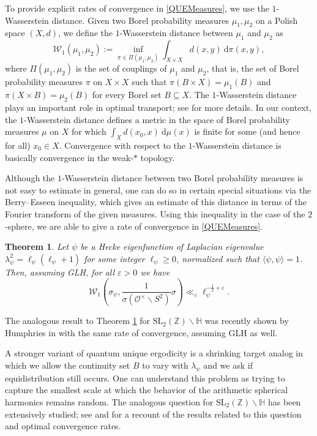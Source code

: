 \documentclass[11pt]{amsart}
\newtheorem{theorem}{Theorem}[section]
\theoremstyle{definition}
\begin{document}
To provide explicit rates of convergence in \eqref{QUEMeasures}, we use the $1$-Wasserstein distance. Given two Borel probability measures $\mu_1, \mu_2$ on a Polish space $(X,d)$, we define the $1$-Wasserstein distance between $\mu_1$ and $\mu_2$ as $$ \mathscr{W}_1(\mu_1, \mu_2) := \inf_{\pi \in \Pi(\mu_1,\mu_2)} \int_{X\times X} d(x,y) \: \mathrm{d}\pi(x,y), $$ where $\Pi(\mu_1, \mu_2)$ is the set of couplings of $\mu_1$ and $\mu_2$, that is, the set of Borel probability measures $\pi$ on $X\times X$ such that $\pi(B\times X)=\mu_1(B)$ and $\pi(X\times B) = \mu_2(B)$ for every Borel set $B\subseteq X$. The $1$-Wasserstein distance plays an important role in optimal transport; see \cite{VillaniOptTransport} for more details. In our context, the $1$-Wasserstein distance defines a metric in the space of Borel probability measures $\mu$ on $X$ for which $\int_{X} d(x_0, x) \: \mathrm{d}\mu(x)$ is finite for some (and hence for all) $x_0 \in X$. Convergence with respect to the $1$-Wasserstein distance is basically convergence in the weak-$*$ topology.

Although the $1$-Wasserstein distance between two Borel probability measures is not easy to estimate in general, one can do so in certain special situations via the Berry--Esseen inequality, which gives an estimate of this distance in terms of the Fourier transform of the given measures. Using this inequality in the case of the $2$-sphere, we are able to give a rate of convergence in \eqref{QUEMeasures}.

\begin{theorem}\label{MainThm-Wass}
Let $\psi$ be a Hecke eigenfunction of Laplacian eigenvalue $\lambda_{\psi}^2 = \ell_{\psi}(\ell_{\psi}+1)$ for some integer $\ell_{\psi} \geq 0$, normalized such that $\langle \psi, \psi \rangle = 1$. Then, assuming GLH, for all $\varepsilon>0$ we have $$ \mathscr{W}_{1}\left(\sigma_{\psi}, \frac{1}{\sigma(\mathcal{O}^{\times} \backslash S^2)} \sigma \right) \ll_{\varepsilon} \ell_{\psi}^{-\frac{1}{2} + \varepsilon}.$$
\end{theorem}

The analogous result to Theorem \ref{MainThm-Wass} for $\mathrm{SL}_{2}(\mathbb{Z}) \backslash \mathbb{H}$ was recently shown by Humphries in \cite{Humphries2025} with the same rate of convergence, assuming GLH as well.

A stronger variant of quantum unique ergodicity is a shrinking target analog in which we allow the continuity set $B$ to vary with $\lambda_{\psi}$ and we ask if equidistribution still occurs. One can understand this problem as trying to capture the smallest scale at which the behavior of the arithmetic spherical harmonics remains random. The analogous question for $\mathrm{SL}_{2}(\mathbb{Z}) \backslash \mathbb{H}$ has been extensively studied; see \cite{HumphriesPhD} and \cite{YoungQUEShrinking} for a recount of the results related to this question and optimal convergence rates.
\end{document}
